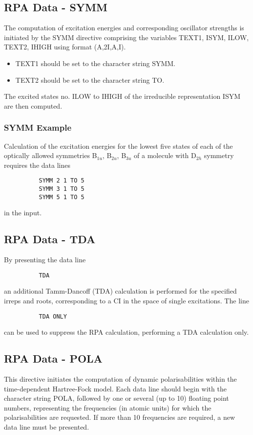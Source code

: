 \documentclass[11pt,fleqn]{article}
\begin{document}
\subsection{RPA Data - SYMM}

The computation of excitation energies and corresponding oscillator
strengths is initiated by the
SYMM directive comprising the variables TEXT1, ISYM, ILOW,
TEXT2, IHIGH using format (A,2I,A,I).
\begin{itemize}
\item TEXT1 should be set to the character string SYMM.
\item TEXT2 should be set to the character string TO.
\end{itemize}
The excited states no. ILOW to IHIGH
of the irreducible representation ISYM are then computed.
\subsubsection{SYMM Example}
Calculation of the excitation energies for the lowest five states of each of
the optically allowed symmetries B$_{1u}$, B$_{2u}$, B$_{3u}$ of a molecule
with D$_{2h}$ symmetry requires the data lines

{
\footnotesize
\begin{verbatim}
          SYMM 2 1 TO 5
          SYMM 3 1 TO 5
          SYMM 5 1 TO 5
\end{verbatim}
}
in the input.
%
\subsection{RPA Data - TDA}
By presenting the data line
{
\footnotesize
\begin{verbatim}
          TDA
\end{verbatim}
}
an additional Tamm-Dancoff (TDA) calculation is performed for the
specified irreps and roots, corresponding to a CI in the space of
single excitations. The line

{
\footnotesize
\begin{verbatim}
          TDA ONLY
\end{verbatim}
}
can be used to suppress the RPA calculation, performing a TDA
calculation only.
%
\subsection{RPA Data - POLA}
This directive initiates the computation of dynamic polarisabilities within
the time-dependent Hartree-Fock model. Each data line should begin with the
character string POLA, followed by one or several (up to 10) floating point
numbers, representing the frequencies (in atomic units) for which the
polarisabilities are requested. If more than 10 frequencies are required,
a new data line must be presented.
%
\end{document}
